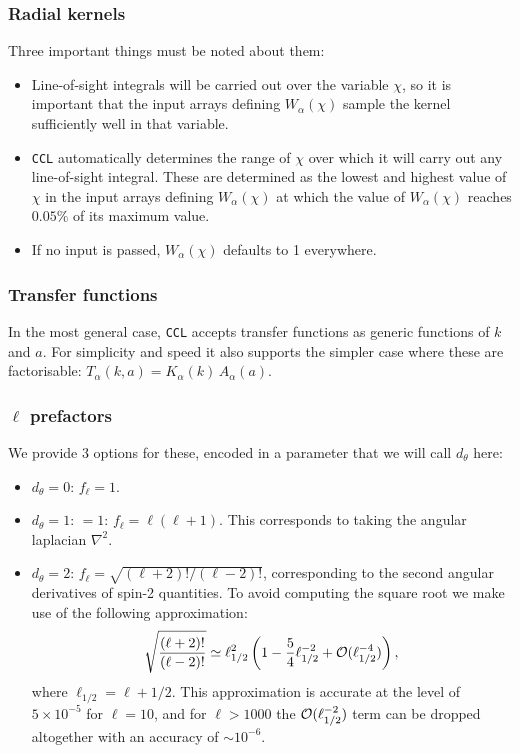 \documentclass[\docopts]{\docclass}
\newcommand{\ccl}{{\tt CCL}\xspace}
\begin{document}
\subsubsection*{Radial kernels}
Three important things must be noted about them:
\begin{itemize}
 \item Line-of-sight integrals will be carried out over the variable $\chi$, so it is important that the input arrays defining $W_\alpha(\chi)$ sample the kernel sufficiently well in that variable.
 \item {\tt CCL} automatically determines the range of $\chi$ over which it will carry out any line-of-sight integral. These are determined as the lowest and highest value of $\chi$ in the input arrays defining $W_\alpha(\chi)$ at which the value of $W_\alpha(\chi)$ reaches $0.05\%$ of its maximum value.
 \item If no input is passed, $W_\alpha(\chi)$ defaults to 1 everywhere.
\end{itemize}

\subsubsection*{Transfer functions}
In the most general case, \ccl accepts transfer functions as generic functions of $k$ and $a$. For simplicity and speed it also supports the simpler case where these are factorisable: $T_\alpha(k,a)=K_\alpha(k)\,A_\alpha(a)$.

\subsubsection*{$\ell$ prefactors}
We provide 3 options for these, encoded in a parameter that we will call $d_\theta$ here:
\begin{itemize}
 \item $d_\theta=0$: $f_\ell=1$.
 \item $d_\theta=1$: $=1$: $f_\ell=\ell(\ell+1)$. This corresponds to taking the angular laplacian $\nabla^2$.
 \item $d_\theta=2$: $f_\ell=\sqrt{(\ell+2)!/(\ell-2)!}$, corresponding to the second angular derivatives of spin-2 quantities. To avoid computing the square root we make use of the following approximation:
   \begin{equation}
     \sqrt{\frac{(\ell+2)!}{(\ell-2)!}}\simeq \ell_{1/2}^2\left(1-\frac{5}{4}\ell_{1/2}^{-2}+{\cal O}(\ell_{1/2}^{-4})\right),
   \end{equation}
   where $\ell_{1/2}=\ell+1/2$. This approximation is accurate at the level of $5\times10^{-5}$ for $\ell=10$, and for $\ell>1000$ the ${\cal O}(\ell_{1/2}^{-2})$ term can be dropped altogether with an accuracy of $\sim10^{-6}$.
\end{itemize}
\end{document}
